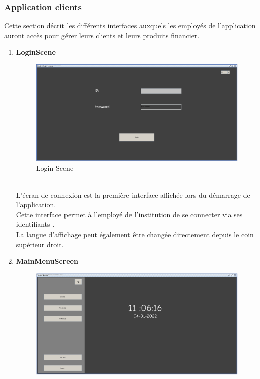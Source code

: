 \documentclass[../rapport.tex]{subfiles}
\begin{document}
\subsubsection{Application clients}
Cette section décrit les différents interfaces auxquels les employés de l'application auront accès pour gérer leurs clients et leurs produits financier.\\

\begin{enumerate}
    \item \textbf{LoginScene} \\
            \begin{figure}[h!]
                    \centering \includegraphics[scale=0.2]{ressources/photos_diagrammes/app2/gui/loginScene.jpg}
                    \caption{Login Scene}
            \end{figure}
            \\
L'écran de connexion est la première interface affichée lors du démarrage de l'application.\\
Cette interface permet à l'employé de l'institution de se connecter via ses identifiants .\\
La langue d'affichage peut également être changée directement depuis le coin supérieur droit.
\item \textbf{MainMenuScreen} \\
		\begin{figure}[h!]
				\centering \includegraphics[scale=0.2]{ressources/photos_diagrammes/app2/gui/mainMenuScene.jpg}

\end{figure}
\end{enumerate}
\end{document}
